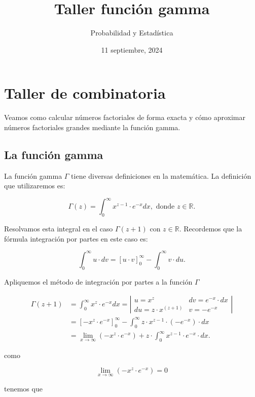 \documentclass[
]{article}
\title{Taller función gamma}
\author{Probabilidad y Estadística}
\date{11 septiembre, 2024}
\begin{document}
\maketitle

{
\hypersetup{linkcolor=blue}
\setcounter{tocdepth}{2}
\tableofcontents
}
\section{Taller de combinatoria}\label{taller-de-combinatoria}

Veamos como calcular números factoriales de forma exacta y cómo
aproximar números factoriales grandes mediante la función gamma.

\subsection{La función gamma}\label{la-funciuxf3n-gamma}

La función gamma \(\Gamma\) tiene diversas definiciones en la
matemática. La definición que utilizaremos es:

\[ \Gamma(z)= \int_0^{\infty} x^{z-1} \cdot e^{-x}  dx, \mbox{ donde } z\in \mathbb{R}.\]

Resolvamos esta integral en el caso \(\Gamma(z+1)\) con
\(z\in \mathbb{R}\). Recordemos que la fórmula integración por partes en
este caso es:

\[\int_{0}^{\infty} u \cdot d v =\left[u\cdot v \right]_0^\infty-\int_0^{\infty} v \cdot du.\]

Apliquemos el método de integración por partes a la función \(\Gamma\)

\[
\begin{aligned}
\Gamma(z+1) &=  \int_0^{\infty} x^{z} \cdot e^{-x}dx= 
\left|
\begin{matrix} u=x^{z}  & dv= e^{-x}\cdot  dx 
\\ du= z \cdot x^(z+1)  & v=-e^{-x} 
\end{matrix}
\right|
\\
&=\left[-x^z\cdot e^{-x}\right]_0^\infty
-\int_0^{\infty} z\cdot x^{z-1} \cdot \left(-e^{-x}\right)\cdot  dx
\\
&=
\lim_{x\to\infty}\left(-x^z\cdot e^{-x}\right)
+
z\cdot \int_0^{\infty} x^{z-1} \cdot e^{-x}\cdot dx.
\end{aligned}
\]

como

\[\lim_{x\to\infty}\left(-x^z\cdot e^{-x}\right)=0\]

tenemos que
\end{document}
